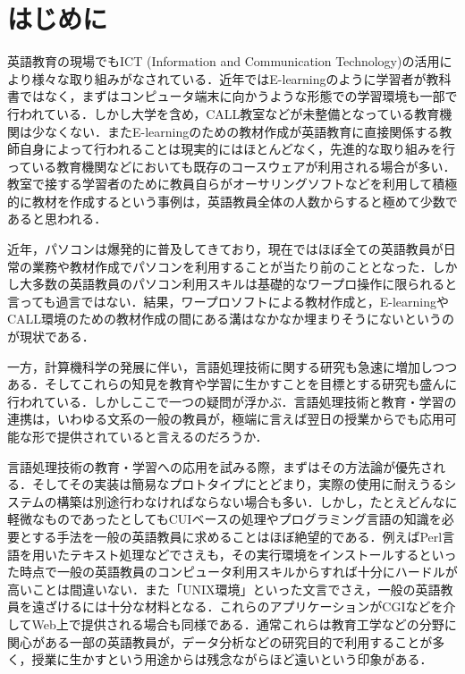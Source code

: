 \documentclass[japanese]{jnlp_1.4}
\begin{document}
\maketitle


\section{はじめに}

英語教育の現場でもICT (Information and Communication Technology)の活用により様々な取り組みがなされている．近年ではE-learningのように学習者が教科書ではなく，まずはコンピュータ端末に向かうような形態での学習環境も一部で行われている．しかし大学を含め，CALL教室などが未整備となっている教育機関は少なくない．またE-learningのための教材作成が英語教育に直接関係する教師自身によって行われることは現実的にはほとんどなく，先進的な取り組みを行っている教育機関などにおいても既存のコースウェアが利用される場合が多い．教室で接する学習者のために教員自らがオーサリングソフトなどを利用して積極的に教材を作成するという事例は，英語教員全体の人数からすると極めて少数であると思われる．

近年，パソコンは爆発的に普及してきており，現在ではほぼ全ての英語教員が日常の業務や教材作成でパソコンを利用することが当たり前のこととなった．しかし大多数の英語教員のパソコン利用スキルは基礎的なワープロ操作に限られると言っても過言ではない．結果，ワープロソフトによる教材作成と，E-learningやCALL環境のための教材作成の間にある溝はなかなか埋まりそうにないというのが現状である．

一方，計算機科学の発展に伴い，言語処理技術に関する研究も急速に増加しつつある．そしてこれらの知見を教育や学習に生かすことを目標とする研究も盛んに行われている．しかしここで一つの疑問が浮かぶ．言語処理技術と教育・学習の連携は，いわゆる文系の一般の教員が，極端に言えば翌日の授業からでも応用可能な形で提供されていると言えるのだろうか．

言語処理技術の教育・学習への応用を試みる際，まずはその方法論が優先される．そしてその実装は簡易なプロトタイプにとどまり，実際の使用に耐えうるシステムの構築は別途行わなければならない場合も多い．しかし，たとえどんなに軽微なものであったとしてもCUIベースの処理やプログラミング言語の知識を必要とする手法を一般の英語教員に求めることはほぼ絶望的である．例えばPerl言語を用いたテキスト処理などでさえも，その実行環境をインストールするといった時点で一般の英語教員のコンピュータ利用スキルからすれば十分にハードルが高いことは間違いない．また「UNIX環境」といった文言でさえ，一般の英語教員を遠ざけるには十分な材料となる．これらのアプリケーションがCGIなどを介してWeb上で提供される場合も同様である．通常これらは教育工学などの分野に関心がある一部の英語教員が，データ分析などの研究目的で利用することが多く，授業に生かすという用途からは残念ながらほど遠いという印象がある．
\end{document}
